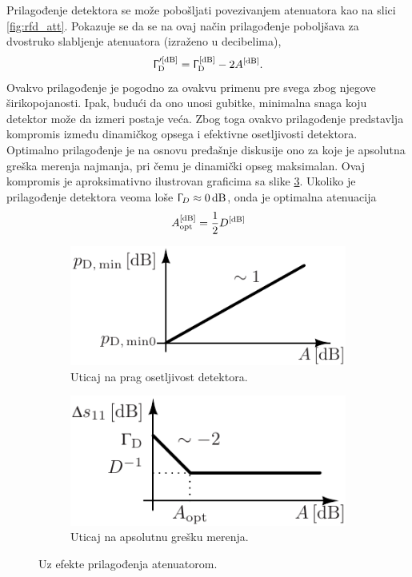 \documentclass[a4paper, 12pt, diplomski]{etf}
\renewcommand{\unit}[1]{\,{\rm #1}}   %
\begin{document}
Prilagođenje detektora se može pobošljati
povezivanjem atenuatora kao na slici \ref{fig:rfd_att}. 
Pokazuje se da se na ovaj način prilagođenje poboljšava za 
dvostruko slabljenje atenuatora (izraženo u decibelima),
\begin{equation}
    \Upgamma_{\rm D}'^{\rm [dB]}= \Upgamma_{\rm D}^{\rm [dB]} - 2A^{\rm [dB]}.
\end{equation}
Ovakvo prilagođenje je pogodno za ovakvu primenu pre svega zbog 
njegove širikopojanosti. Ipak, budući da ono unosi gubitke, minimalna snaga
koju detektor može da izmeri postaje veća. Zbog toga ovakvo prilagođenje 
predstavlja kompromis između dinamičkog opsega i efektivne osetljivosti 
detektora. Optimalno prilagođenje je na osnovu pređašnje diskusije 
ono za koje je apsolutna 
greška merenja najmanja, pri čemu je dinamički 
opseg maksimalan. Ovaj kompromis je aproksimativno ilustrovan 
 graficima
sa slike \ref{fig:attcomp}. Ukoliko je prilagođenje detektora 
veoma loše $\Upgamma_D \approx 0\unit{dB}$, onda je optimalna
atenuacija
\begin{equation}
    A_{\rm opt}^{\rm [dB]} = \dfrac{1}{2} D^{\rm [dB]}
\end{equation}

\begin{figure}[ht!]
    \hfill
    \begin{subfigure}[b]{0.49\textwidth}
        \centering
        \includegraphics[scale=1]{fig/pA_plot.pdf}
        \caption{Uticaj na prag osetljivost detektora.}
        \label{fig:pA}
    \end{subfigure}
    \hfill
    \begin{subfigure}[b]{0.49\textwidth}
        \centering
        \includegraphics[scale=1]{fig/gD_plot.pdf}
        \caption{Uticaj na apsolutnu grešku merenja.}
        \label{fig:gD}
    \end{subfigure}
    \hfill
    \caption{Uz efekte prilagođenja atenuatorom.}
    \label{fig:attcomp}
\end{figure}
\end{document}

